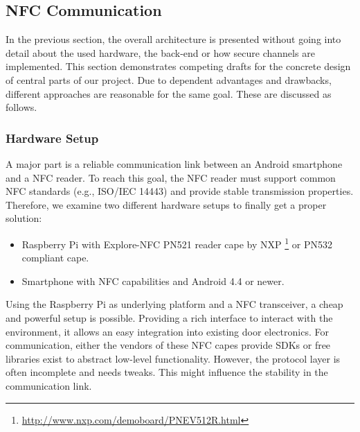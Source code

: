 
\subsection{NFC Communication}\label{sec:comm}



In the previous section, the overall architecture is presented without going into detail about the used hardware, the back-end or how secure channels are implemented.
This section demonstrates competing drafts for the concrete design of central parts of our project. 
Due to dependent advantages and drawbacks, different approaches are reasonable for the same goal. These are discussed as follows.


\subsubsection{Hardware Setup}
A major part is a reliable communication link between an Android smartphone and a NFC reader.
To reach this goal, the NFC reader must support common NFC standards (e.g., ISO/IEC 14443) and provide stable transmission properties.
Therefore, we examine two different hardware setups to finally get a proper solution:
%
\begin{itemize}
	\item Raspberry Pi with Explore-NFC PN521 reader cape by NXP \footnote{\url{http://www.nxp.com/demoboard/PNEV512R.html}} or PN532 compliant cape.
	\item Smartphone with NFC capabilities and Android 4.4 or newer.
\end{itemize}
%
Using the Raspberry Pi as underlying platform and a NFC transceiver, a cheap and powerful setup is possible.
Providing a rich interface to interact with the environment, it allows an easy integration into existing door electronics.
For communication, either the vendors of these NFC capes provide SDKs or free libraries exist to abstract low-level functionality. 
However, the protocol layer is often incomplete and needs tweaks. This might influence the stability in the communication link.

